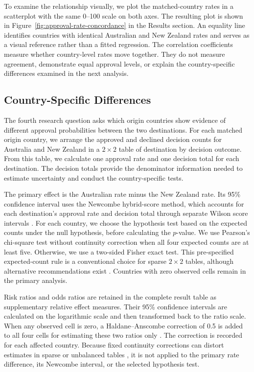 \documentclass[runningheads]{llncs}
\begin{document}
To examine the relationship visually, we plot the matched-country rates in a scatterplot with the same 0--100 scale on both axes. The resulting plot is shown in Figure~\ref{fig:approval-rate-concordance} in the Results section. An equality line identifies countries with identical Australian and New Zealand rates and serves as a visual reference rather than a fitted regression. The correlation coefficients measure whether country-level rates move together. They do not measure agreement, demonstrate equal approval levels, or explain the country-specific differences examined in the next analysis.

\subsection{Country-Specific Differences}

The fourth research question asks which origin countries show evidence of different approval probabilities between the two destinations. For each matched origin country, we arrange the approved and declined decision counts for Australia and New Zealand in a $2\times2$ table of destination by decision outcome. From this table, we calculate one approval rate and one decision total for each destination. The decision totals provide the denominator information needed to estimate uncertainty and conduct the country-specific tests.

The primary effect is the Australian rate minus the New Zealand rate. Its 95\% confidence interval uses the Newcombe hybrid-score method, which accounts for each destination's approval rate and decision total through separate Wilson score intervals \cite{Newcombe1998}. For each country, we choose the hypothesis test based on the expected counts under the null hypothesis, before calculating the $p$-value. We use Pearson's chi-square test without continuity correction when all four expected counts are at least five. Otherwise, we use a two-sided Fisher exact test. This pre-specified expected-count rule is a conventional choice for sparse $2\times2$ tables, although alternative recommendations exist \cite{Campbell2007}. Countries with zero observed cells remain in the primary analysis.

Risk ratios and odds ratios are retained in the complete result table as supplementary relative effect measures. Their 95\% confidence intervals are calculated on the logarithmic scale and then transformed back to the ratio scale. When any observed cell is zero, a Haldane--Anscombe correction of 0.5 is added to all four cells for estimating these two ratios only \cite{GartZweifel1967}. The correction is recorded for each affected country. Because fixed continuity corrections can distort estimates in sparse or unbalanced tables \cite{SweetingEtAl2004}, it is not applied to the primary rate difference, its Newcombe interval, or the selected hypothesis test.
\end{document}
